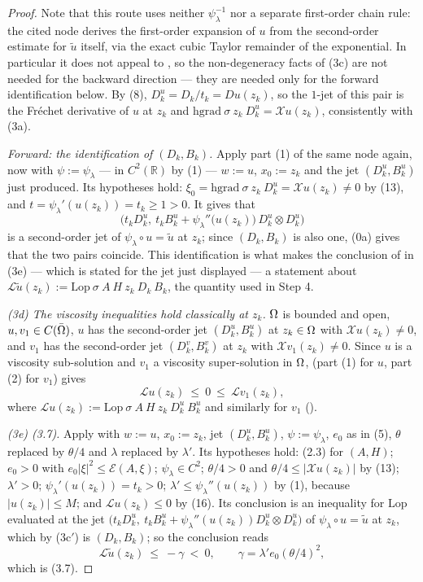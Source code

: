 \begin{proof}
Note that this route uses neither $\psi_\lambda^{-1}$ nor a separate first-order chain rule:
the cited node derives the first-order expansion of $u$ from the second-order estimate for
$\tilde u$ itself, via the exact cubic Taylor remainder of the exponential. In particular it
does not appeal to , so the non-degeneracy facts of (3c) are
not needed for the backward direction --- they are needed only for the forward
identification below. By (8), $D^{u}_k=D_k/t_k=Du(z_k)$, so the $1$-jet of this pair is the
Fr\'echet derivative of $u$ at $z_k$ and
$\mathrm{hgrad}\ \sigma\ z_k\ D^{u}_k=\mathcal Xu(z_k)$, consistently with (3a).

\emph{Forward: the identification of $(D_k,B_k)$.} Apply part (1) of the same node again,
now with $\psi:=\psi_\lambda$ --- in $C^{2}(\mathbb R)$ by (1) ---
$w:=u$, $x_0:=z_k$ and the jet $(D^{u}_k,B^{u}_k)$ just produced. Its hypotheses hold:
$\xi_0=\mathrm{hgrad}\ \sigma\ z_k\ D^{u}_k=\mathcal Xu(z_k)\ne0$ by (13), and
$t=\psi_\lambda'(u(z_k))=t_k\ge1>0$. It gives that
\[
 \Big(t_kD^{u}_k,\ t_kB^{u}_k+\psi_\lambda''\big(u(z_k)\big)\,D^{u}_k\otimes D^{u}_k\Big)
\]
is a second-order jet of $\psi_\lambda\circ u=\tilde u$ at $z_k$; since $(D_k,B_k)$ is also
one, (0a) gives that the two pairs coincide. This identification is what makes the
conclusion of  in (3e) --- which is stated for the
jet just displayed --- a statement about
$\mathcal L\tilde u(z_k):=\mathrm{Lop}\ \sigma\ A\ H\ z_k\ D_k\ B_k$, the quantity used in
Step 4.

\emph{(3d) The viscosity inequalities hold classically at $z_k$.} $\Omega$ is bounded and
open, $u,v_1\in C(\bar{\Omega})$, $u$ has the second-order jet $(D^{u}_k,B^{u}_k)$ at $z_k\in\Omega$
with $\mathcal Xu(z_k)\ne0$, and $v_1$ has the second-order jet $(D^{v}_k,B^{v}_k)$ at
$z_k$ with $\mathcal Xv_1(z_k)\ne0$. Since $u$ is a viscosity sub-solution and $v_1$ a
viscosity super-solution in $\Omega$,  (part (1) for $u$, part
(2) for $v_1$) gives
\[
 \mathcal Lu(z_k)\ \le\ 0\ \le\ \mathcal Lv_1(z_k) , \tag{16}
\]
where $\mathcal Lu(z_k):=\mathrm{Lop}\ \sigma\ A\ H\ z_k\ D^{u}_k\ B^{u}_k$ and
similarly for $v_1$ ().

\emph{(3e) (3.7).} Apply  with
$w:=u$, $x_0:=z_k$, jet $(D^{u}_k,B^{u}_k)$, $\psi:=\psi_\lambda$, $e_0$ as in (5),
$\theta$ replaced by $\theta/4$ and $\lambda$ replaced by $\lambda'$. Its hypotheses hold:
(2.3) for $(A,H)$; $e_0>0$ with $e_0|\xi|^{2}\le\mathcal E(A,\xi)$; $\psi_\lambda\in C^{2}$;
$\theta/4>0$ and $\theta/4\le|\mathcal Xu(z_k)|$ by (13); $\lambda'>0$;
$\psi_\lambda'(u(z_k))=t_k>0$; $\lambda'\le\psi_\lambda''(u(z_k))$ by (1), because
$|u(z_k)|\le M$; and $\mathcal Lu(z_k)\le0$ by (16). Its conclusion is an inequality for
$\mathrm{Lop}$ evaluated at the jet
$\big(t_kD^{u}_k,\ t_kB^{u}_k+\psi_\lambda''(u(z_k))D^{u}_k\otimes D^{u}_k\big)$ of
$\psi_\lambda\circ u=\tilde u$ at $z_k$, which by (3c$'$) is $(D_k,B_k)$; so the conclusion
reads
\[
 \mathcal L\tilde u(z_k)\ \le\ -\gamma\ <\ 0,\qquad \gamma=\lambda'e_0(\theta/4)^{2},
 \tag{17}
\]
which is (3.7).


\end{proof}
